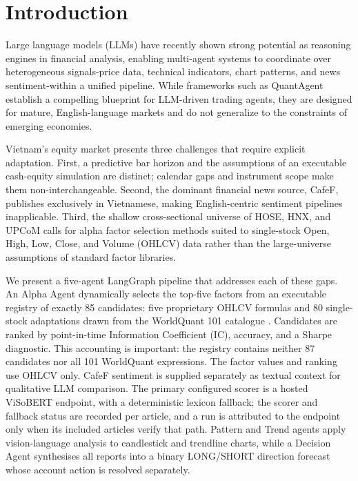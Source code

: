 \section{Introduction}

Large language models (LLMs) have recently shown strong potential as reasoning engines in financial analysis, enabling multi-agent systems to coordinate over heterogeneous signals-price data, technical indicators, chart patterns, and news sentiment-within a unified pipeline. While frameworks such as QuantAgent \cite{xiong2025quantagent} establish a compelling blueprint for LLM-driven trading agents, they are designed for mature, English-language markets and do not generalize to the constraints of emerging economies.

Vietnam's equity market presents three challenges that require explicit adaptation. First, a predictive bar horizon and the assumptions of an executable cash-equity simulation are distinct; calendar gaps and instrument scope make them non-interchangeable. Second, the dominant financial news source, CafeF, publishes exclusively in Vietnamese, making English-centric sentiment pipelines inapplicable. Third, the shallow cross-sectional universe of HOSE, HNX, and UPCoM calls for alpha factor selection methods suited to single-stock Open, High, Low, Close, and Volume (OHLCV) data rather than the large-universe assumptions of standard factor libraries.

We present a five-agent LangGraph \cite{langgraph2024} pipeline that addresses each of these gaps. An Alpha Agent dynamically selects the top-five factors from an executable registry of exactly 85 candidates: five proprietary OHLCV formulas and 80 single-stock adaptations drawn from the WorldQuant 101 catalogue \cite{kakushadze2016formulaic}. Candidates are ranked by point-in-time Information Coefficient (IC), accuracy, and a Sharpe diagnostic. This accounting is important: the registry contains neither 87 candidates nor all 101 WorldQuant expressions. The factor values and ranking use OHLCV only. CafeF sentiment is supplied separately as textual context for qualitative LLM comparison. The primary configured scorer is a hosted ViSoBERT \cite{nguyen2023visobert} endpoint, with a deterministic lexicon fallback; the scorer and fallback status are recorded per article, and a run is attributed to the endpoint only when its included articles verify that path. Pattern and Trend agents apply vision-language analysis to candlestick and trendline charts, while a Decision Agent synthesises all reports into a binary LONG/SHORT direction forecast whose account action is resolved separately.

